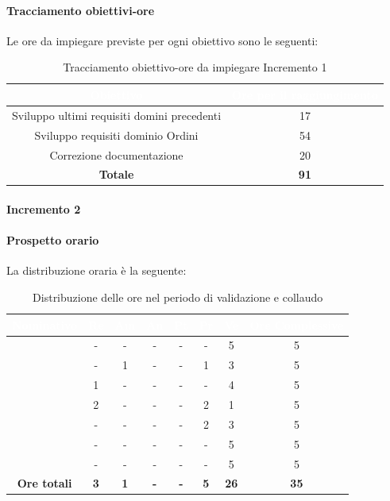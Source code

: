 \paragraph*{Tracciamento obiettivi-ore}
Le ore da impiegare previste per ogni obiettivo sono le seguenti:
\begin{table}[H]
	\begin{center}
		\begin{tabular}{ |c c| }
			\rowcolor{darkblue} 
			\textcolor{white}{\textbf{Obiettivo}}	& \textcolor{white}{\textbf{Ore per il raggiungimento}} \\ \hline
			{Sviluppo ultimi requisiti domini precedenti} 	& 17 	\\ \hline
			{Sviluppo requisiti dominio Ordini} 	& 54 	\\ \hline
			{Correzione documentazione} 			&  20	\\ \hline
			\textbf{Totale} 						& \textbf{91}  \\ \hline
		\end{tabular}
		\caption{Tracciamento obiettivo-ore da impiegare Incremento 1}
	\end{center}
\end{table}
\paragraph{Incremento 2}
\paragraph*{Prospetto orario}
La distribuzione oraria è la seguente:
\begin{table}[H]
	\begin{center}
		\begin{tabular}{ |c c c c c c c c| }
			\rowcolor{darkblue} 
			\textcolor{white}{\textbf{Nominativo}} & \textcolor{white}{\textbf{Re}} & \textcolor{white}{\textbf{Am}} & \textcolor{white}{\textbf{An}} & \textcolor{white}{\textbf{Pt}} & \textcolor{white}{\textbf{Pr}} & \textcolor{white}{\textbf{Ve}} & \textcolor{white}{\textbf{Ore Complessive}} \\ \hline
			\BL 	& -  	& -  	& - 	& - 	& - 	& 5 	& 5 \\ \hline
			\FF 	& -  	& 1  	& - 	& - 	& 1 	& 3  	& 5 \\ \hline
			\MM 	& 1 	& - 	& - 	& - 	& - 	& 4  	& 5 \\ \hline
			\PC 	& 2 	& -  	& - 	& - 	& 2 	& 1 	& 5 \\ \hline
			\TG 	& -  	& - 	& - 	& - 	& 2 	& 3 	& 5 \\ \hline
			\TL 	& -  	& - 	& - 	& - 	& - 	& 5 	& 5 \\ \hline
			\VD 	& -  	& -  	& - 	& - 	& - 	& 5  	& 5 \\ \hline
			\textbf{Ore totali} & \textbf{3} & \textbf{1} & \textbf{-} & \textbf{-} & \textbf{5} & \textbf{26} & \textbf{35} \\ \hline
		\end{tabular}
		\caption{Distribuzione delle ore nel periodo di validazione e collaudo}
	\end{center}
\end{table}
